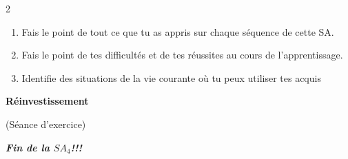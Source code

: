 \begin{multicols*}{2}
 	\begin{enumerate}
 		\item  Fais le point de tout ce que tu as appris sur chaque séquence de cette SA. 
 		\item  Fais le point de tes difficultés et de tes réussites au cours de l'apprentissage.
 		\item  Identifie des situations de la vie courante où tu peux utiliser tes acquis
 	\end{enumerate}
 	 \textbf{Réinvestissement}
 	
 	(Séance d'exercice)
 	
 	\begin{center}
 		\it\textit{\textbf{Fin de la $SA_{4} $!!!}}
 	\end{center}
 \end{multicols*}
 
 